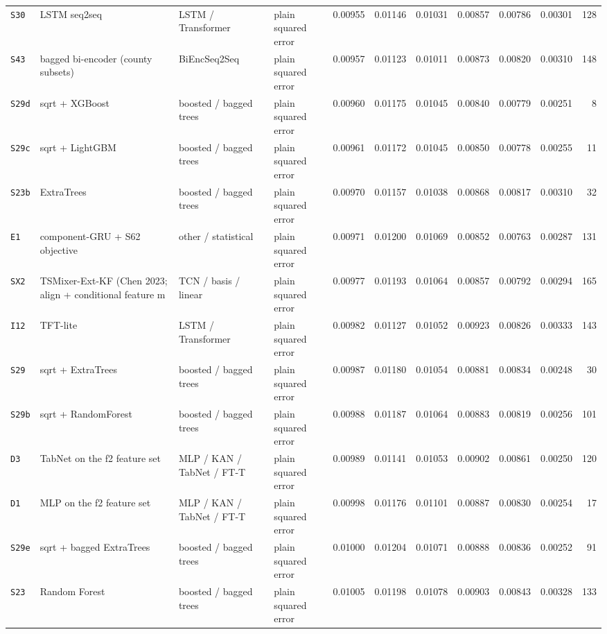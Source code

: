 \documentclass[9pt,landscape]{article}
\begin{document}
\begin{longtable}{@{}p{1.1cm}p{5.4cm}p{3.1cm}p{2.7cm}rrrrrrr@{}}
\texttt{S30} & LSTM seq2seq & LSTM / Transformer & plain squared error & 0.00955 & 0.01146 & 0.01031 & 0.00857 & 0.00786 & 0.00301 & 128 \\
\texttt{S43} & bagged bi-encoder (county subsets) & BiEncSeq2Seq & plain squared error & 0.00957 & 0.01123 & 0.01011 & 0.00873 & 0.00820 & 0.00310 & 148 \\
\texttt{S29d} & sqrt + XGBoost & boosted / bagged trees & plain squared error & 0.00960 & 0.01175 & 0.01045 & 0.00840 & 0.00779 & 0.00251 & 8 \\
\texttt{S29c} & sqrt + LightGBM & boosted / bagged trees & plain squared error & 0.00961 & 0.01172 & 0.01045 & 0.00850 & 0.00778 & 0.00255 & 11 \\
\texttt{S23b} & ExtraTrees & boosted / bagged trees & plain squared error & 0.00970 & 0.01157 & 0.01038 & 0.00868 & 0.00817 & 0.00310 & 32 \\
\texttt{E1} & component-GRU + S62 objective & other / statistical & plain squared error & 0.00971 & 0.01200 & 0.01069 & 0.00852 & 0.00763 & 0.00287 & 131 \\
\texttt{SX2} & TSMixer-Ext-KF (Chen 2023; align + conditional feature m & TCN / basis / linear & plain squared error & 0.00977 & 0.01193 & 0.01064 & 0.00857 & 0.00792 & 0.00294 & 165 \\
\texttt{I12} & TFT-lite & LSTM / Transformer & plain squared error & 0.00982 & 0.01127 & 0.01052 & 0.00923 & 0.00826 & 0.00333 & 143 \\
\texttt{S29} & sqrt + ExtraTrees & boosted / bagged trees & plain squared error & 0.00987 & 0.01180 & 0.01054 & 0.00881 & 0.00834 & 0.00248 & 30 \\
\texttt{S29b} & sqrt + RandomForest & boosted / bagged trees & plain squared error & 0.00988 & 0.01187 & 0.01064 & 0.00883 & 0.00819 & 0.00256 & 101 \\
\texttt{D3} & TabNet on the f2 feature set & MLP / KAN / TabNet / FT-T & plain squared error & 0.00989 & 0.01141 & 0.01053 & 0.00902 & 0.00861 & 0.00250 & 120 \\
\texttt{D1} & MLP on the f2 feature set & MLP / KAN / TabNet / FT-T & plain squared error & 0.00998 & 0.01176 & 0.01101 & 0.00887 & 0.00830 & 0.00254 & 17 \\
\texttt{S29e} & sqrt + bagged ExtraTrees & boosted / bagged trees & plain squared error & 0.01000 & 0.01204 & 0.01071 & 0.00888 & 0.00836 & 0.00252 & 91 \\
\texttt{S23} & Random Forest & boosted / bagged trees & plain squared error & 0.01005 & 0.01198 & 0.01078 & 0.00903 & 0.00843 & 0.00328 & 133 \\

\end{longtable}
\end{document}

